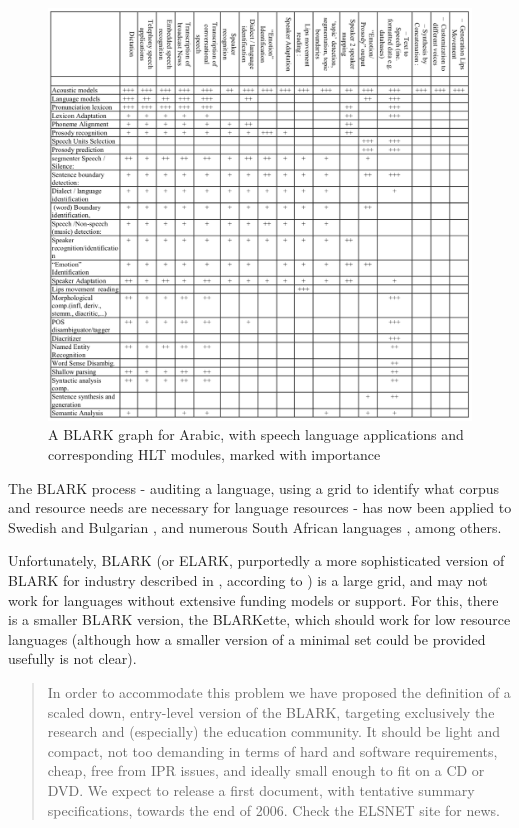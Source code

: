 \begin{figure}
 \centering
 \includegraphics[width=1\textwidth]{img/blark2.png}
 \caption{A BLARK graph for Arabic, with speech language applications and corresponding HLT modules, marked with importance \citep[776]{maegaard2006blark}}
 \label{fig:blark2}
\end{figure}

The BLARK process - auditing a language, using a grid to identify what corpus and resource needs are necessary for language resources - has now been applied to Swedish \citep{elenius2008language} and Bulgarian \citep{simov2004language}, and numerous South African languages \citep{grover2011south}, among others.

Unfortunately, BLARK (or ELARK, purportedly a more sophisticated version of BLARK for industry described in \citet{mapelli2003report}, according to \citep{grover2011south}) is a large grid, and may not work for languages without extensive funding models or support. For this, there is a smaller BLARK version, the BLARKette, which should work for low resource languages (although how a smaller version of a minimal set could be provided usefully is not clear).

\begin{quote}
In order to accommodate this problem we have proposed the definition of a scaled down, entry-level version of the BLARK, targeting exclusively the research and (especially) the education community. It should be light and compact, not too demanding in terms of hard and software requirements, cheap, free from IPR issues, and ideally small enough to fit on a CD or DVD. We expect to release a first document, with tentative summary specifications, towards the end of 2006. Check the ELSNET site for news. \citep{krauwer2006strengthening}
\end{quote}

